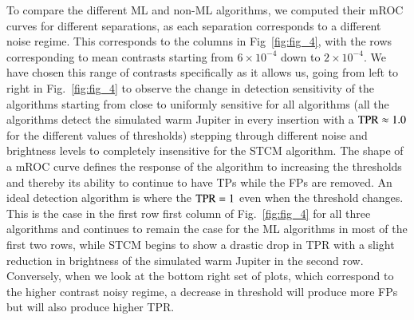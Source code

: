 \documentclass{aa}
\begin{document}
To compare the different ML and non-ML algorithms, we computed their mROC curves for different separations, as each separation corresponds to a different noise regime.
This corresponds to the columns in Fig~\ref{fig:fig_4}, with the rows corresponding to mean contrasts starting from $6\times10^{-4}$ down to $2\times10^{-4}$.
We have chosen this range of contrasts specifically as it allows us, going from left to right in Fig.~\ref{fig:fig_4} to observe the change in detection sensitivity of the algorithms starting from close to uniformly sensitive for all algorithms (all the algorithms detect the simulated warm Jupiter in every insertion with a ${\rm TPR}\approx 1.0$ for the different values of thresholds) stepping through different noise and brightness levels to completely insensitive for the STCM algorithm.
The shape of a mROC curve defines the response of the algorithm to increasing the thresholds and thereby its ability to continue to have TPs while the FPs are removed.
An ideal detection algorithm is where the ${\rm TPR}=1$ even when the threshold changes.
This is the case in the first row first column of Fig.~\ref{fig:fig_4} for all three algorithms and continues to remain the case for the ML algorithms in most of the first two rows, while STCM begins to show a drastic drop in TPR with a slight reduction in brightness of the simulated warm Jupiter in the second row.
Conversely, when we look at the bottom right set of plots, which correspond to the higher contrast noisy regime, a decrease in threshold will produce more FPs but will also produce higher TPR. 
\end{document}
